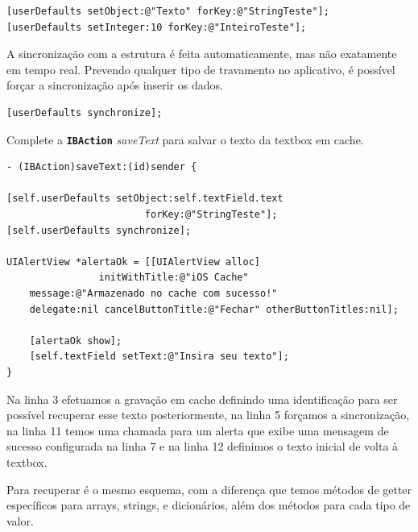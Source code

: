 \documentclass[a4paper,12pt,brazil,doubleside]{book}
\begin{document}
\begin{singlespace}
\begin{listing}[H]
\begin{verbatim}
[userDefaults setObject:@"Texto" forKey:@"StringTeste"];
[userDefaults setInteger:10 forKey:@"InteiroTeste"];
\end{verbatim}
\caption{Gravação de dados em cache}
\end{listing}


A sincronização com a estrutura é feita automaticamente, mas não exatamente em tempo real. Prevendo qualquer tipo de travamento no aplicativo, é possível forçar a sincronização após inserir os dados.

\begin{listing}[H]
\begin{verbatim}
[userDefaults synchronize];
\end{verbatim}
\caption{Sincronização dos dados salvos}
\end{listing}


Complete a \texttt{\textbf{IBAction}} \emph{saveText} para salvar o texto da textbox em cache.

\begin{listing}[H]
\begin{verbatim}
- (IBAction)saveText:(id)sender {
    
[self.userDefaults setObject:self.textField.text 
						forKey:@"StringTeste"];
[self.userDefaults synchronize];
    
UIAlertView *alertaOk = [[UIAlertView alloc] 
				initWithTitle:@"iOS Cache" 
	message:@"Armazenado no cache com sucesso!"
	delegate:nil cancelButtonTitle:@"Fechar" otherButtonTitles:nil];
    
    [alertaOk show];
    [self.textField setText:@"Insira seu texto"];
}
\end{verbatim}
\caption{Método \emph{saveText} para salvar o texto de uma textbox em cache}
\end{listing}


Na linha 3 efetuamos a gravação em cache definindo uma identificação para ser possível recuperar esse texto posteriormente, na linha 5 forçamos a sincronização, na linha 11 temos uma chamada para um alerta que exibe uma mensagem de sucesso configurada na linha 7 e na linha 12 definimos o texto inicial de volta à textbox.


Para recuperar é o mesmo esquema, com a diferença que temos métodos de getter específicos para arrays, strings, e dicionários, além dos métodos para cada tipo de valor.


\end{singlespace}
\end{document}
